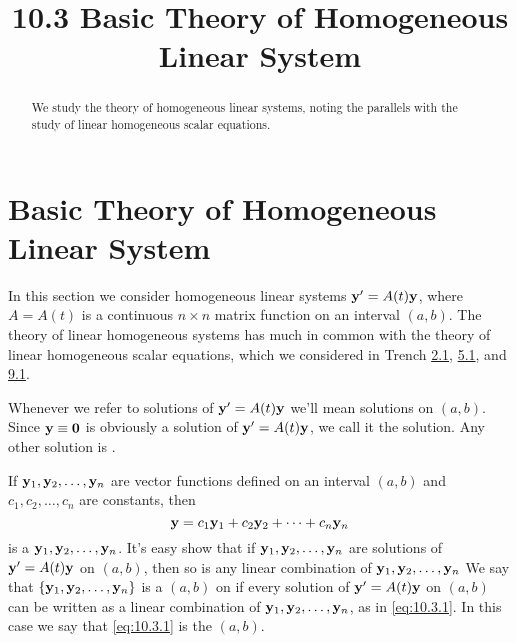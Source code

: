 \documentclass{ximera}
\title{10.3 Basic Theory of Homogeneous Linear System}%
\begin{document}
\begin{abstract}
We study the theory of homogeneous linear systems, noting the parallels with the study of linear homogeneous scalar equations.
\end{abstract}

\maketitle

\section*{Basic Theory of Homogeneous Linear System}

In this section we consider homogeneous linear systems ${\bf y}'=
A(t){\bf y}$, where $A=A(t)$ is a continuous $n\times n$ matrix
function on an interval $(a,b)$. The theory of linear homogeneous
systems has much in common with the theory of linear homogeneous
scalar equations, which we considered in
Trench \href{https://ximera.osu.edu/ode/main/linearFirstOrderDiffEq/linearFirstOrderDiffEq}{2.1}, \href{https://ximera.osu.edu/ode/main/homogeneousLinearEquations/homogeneousLinearEquations}{5.1}, and \href{https://ximera.osu.edu/ode/main/linearHigherOrder/linearHigherOrder}{9.1}.

Whenever we refer to solutions of ${\bf y}'=A(t){\bf y}$ we'll mean
solutions on $(a,b)$. Since ${\bf y}\equiv{\bf 0}$ is obviously a
solution of ${\bf y}'=A(t){\bf y}$, we call it the 
solution. Any other solution is .

If ${\bf y}_1, {\bf y}_2, \dots, {\bf y}_n$ are vector functions
defined on an interval $(a,b)$ and $c_1, c_2, \dots, c_n$ are
constants, then
\begin{equation} \label{eq:10.3.1}
{\bf y}=c_1{\bf y}_1+c_2{\bf y}_2+\cdots+c_n{\bf y}_n
\end{equation}
is a  ${\bf y}_1, {\bf y}_2, \ldots,{\bf
y}_n$. It's easy show that if ${\bf
y}_1, {\bf y}_2, \dots,{\bf y}_n$ are solutions of ${\bf y}'=A(t){\bf
y}$ on $(a,b)$, then so is any linear combination of
 ${\bf y}_1, {\bf y}_2, \dots, {\bf y}_n$ %
 We say that
$\{{\bf y}_1,{\bf y}_2,\dots,{\bf y}_n\}$ is a  $(a,b)$ on if every solution of
${\bf y}'=A(t){\bf y}$ on $(a,b)$ can be written as a linear combination of
${\bf y}_1, {\bf y}_2, \dots, {\bf y}_n$, as in \eqref{eq:10.3.1}.
In this
case we say that \eqref{eq:10.3.1} is the  $(a,b)$.
\end{document}
